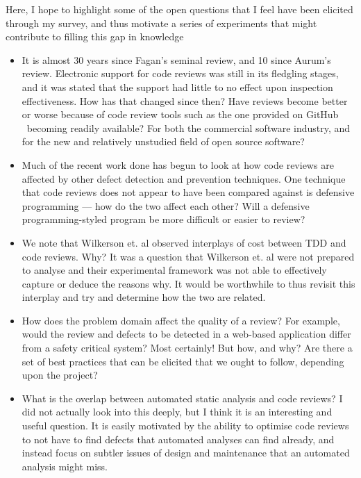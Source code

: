 Here, I hope to highlight some of the open questions that I feel have been elicited through my
survey, and thus motivate a series of experiments that might contribute to filling this gap in
knowledge

\begin{itemize}
	\item It is almost 30 years since Fagan's seminal review, and 10 since Aurum's review. Electronic
		support for code reviews was still in its fledgling stages, and it was stated that the support
		had little to no effect upon inspection effectiveness. How has that changed since then? Have
		reviews become better or worse because of code review tools such as the one provided on GitHub
		\FIXME\ becoming readily available?
		For both the commercial software industry, and for the new and relatively unstudied field of open source software?
	\item Much of the recent work done has begun to look at how code reviews are affected by other
		defect detection and prevention techniques.
		One technique that code reviews does not appear to have been compared against is defensive
		programming --- how do the two affect each other?
		Will a defensive programming-styled program be more difficult or easier to review?
	\item We note that Wilkerson et. al \cite{wilkerson2012comparing} observed interplays of cost
		between TDD and code reviews. Why? It was a question that Wilkerson et. al were not prepared to analyse
		and their experimental framework was not able to effectively capture or deduce the reasons why.
		It would be worthwhile to thus revisit this interplay and try and determine how the two are
		related.
	\item How does the problem domain affect the quality of a review? For example, would the review
		and defects to be detected in a web-based application differ from a safety critical system? Most
		certainly! But how, and why? Are there a set of best practices that can be elicited that we
		ought to follow, depending upon the project?
	\item What is the overlap between automated static analysis and code reviews? I did not actually
		look into this deeply, but I think it is an interesting and useful question. It is easily
		motivated by the ability to optimise code reviews to not have to find defects that automated
		analyses can find already, and instead focus on subtler issues of design and maintenance that an
		automated analysis might miss.
\end{itemize}
